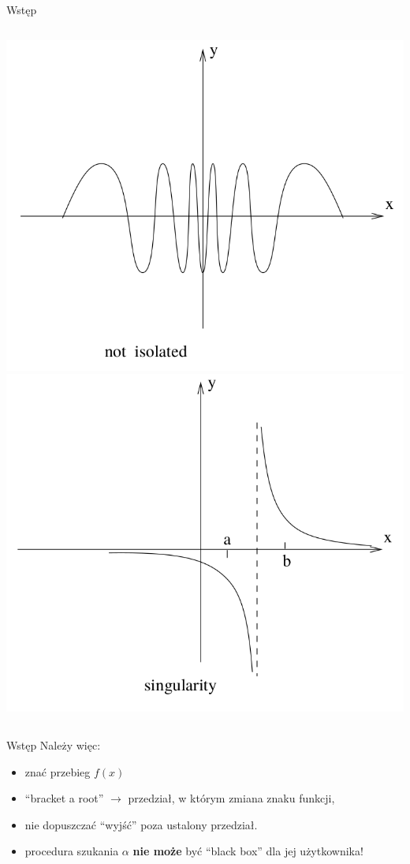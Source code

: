 \begin{frame}{Wstęp}
	\begin{columns}
		\centering   \includegraphics[width=1\linewidth]{img/7/7_1_4}
		\centering   \includegraphics[width=1\linewidth]{img/7/7_1_5}
	\end{columns}
\end{frame}
\begin{frame}{Wstęp}
	Należy więc:
	\begin{itemize}
		\item znać przebieg $f(x)$
		\item ``bracket a root''\newline
			  $\rightarrow$ przedział, w którym zmiana znaku funkcji,
		\item nie dopuszczać ``wyjść'' poza ustalony przedział.
		\item procedura szukania $\alpha$ {\bf nie może} być ``black box'' dla jej użytkownika!
	\end{itemize}
\end{frame}
